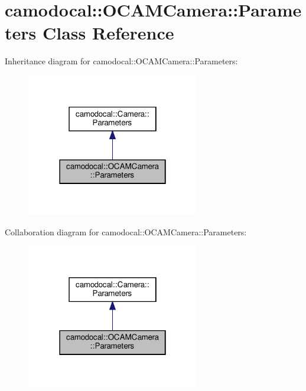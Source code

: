 \hypertarget{classcamodocal_1_1OCAMCamera_1_1Parameters}{}\section{camodocal\+:\+:O\+C\+A\+M\+Camera\+:\+:Parameters Class Reference}
\label{classcamodocal_1_1OCAMCamera_1_1Parameters}


Inheritance diagram for camodocal\+:\+:O\+C\+A\+M\+Camera\+:\+:Parameters\+:\nopagebreak
\begin{figure}[H]
\begin{center}
\leavevmode
\includegraphics[width=214pt]{classcamodocal_1_1OCAMCamera_1_1Parameters__inherit__graph}
\end{center}
\end{figure}


Collaboration diagram for camodocal\+:\+:O\+C\+A\+M\+Camera\+:\+:Parameters\+:\nopagebreak
\begin{figure}[H]
\begin{center}
\leavevmode
\includegraphics[width=214pt]{classcamodocal_1_1OCAMCamera_1_1Parameters__coll__graph}
\end{center}
\end{figure}
